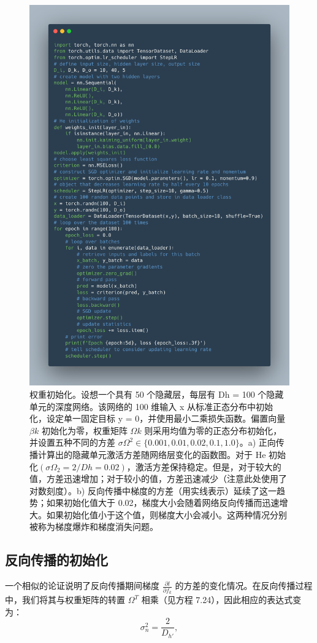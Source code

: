 \begin{figure}[ht!]
\centering
\includegraphics[width=0.7\linewidth]{png/chapter7/code.png}
\caption{权重初始化。设想一个具有 50 个隐藏层，每层有 Dh = 100 个隐藏单元的深度网络。该网络的 100 维输入 x 从标准正态分布中初始化，设定单一固定目标 y = 0，并使用最小二乘损失函数。偏置向量 \(\beta k\) 初始化为零，权重矩阵 \(\Omega k\) 则采用均值为零的正态分布初始化，并设置五种不同的方差 \(\sigma \Omega^2 \in \{0.001, 0.01, 0.02, 0.1, 1.0\}\)。a) 正向传播计算出的隐藏单元激活方差随网络层变化的函数图。对于 He 初始化\((\sigma \Omega_2 = 2/Dh = 0.02)\)，激活方差保持稳定。但是，对于较大的值，方差迅速增加；对于较小的值，方差迅速减少（注意此处使用了对数刻度）。b) 反向传播中梯度的方差（用实线表示）延续了这一趋势；如果初始化值大于 0.02，梯度大小会随着网络反向传播而迅速增大。如果初始化值小于这个值，则梯度大小会减小。这两种情况分别被称为梯度爆炸和梯度消失问题。}
\end{figure}

\subsection{反向传播的初始化}
一个相似的论证说明了反向传播期间梯度 \(\frac{\partial l}{\partial f_k}\) 的方差的变化情况。在反向传播过程中，我们将其与权重矩阵的转置 \(\Omega^T\) 相乘（见方程 7.24），因此相应的表达式变为：
\begin{equation}
\sigma^2_n = \frac{2}{D_{h'}}, 
\end{equation}

